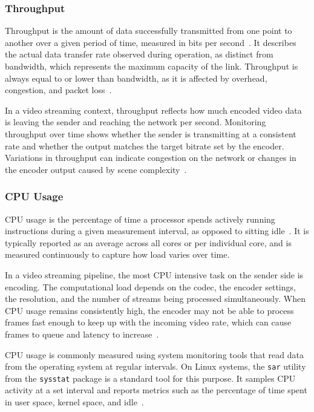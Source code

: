 \subsubsection{Throughput}\label{subsec:throughput}
Throughput is the amount of data successfully transmitted from one point to another over a given period of time, measured in bits per second~\cite{forouzan2012}. It describes the actual data transfer rate observed during operation, as distinct from bandwidth, which represents the maximum capacity of the link. Throughput is always equal to or lower than bandwidth, as it is affected by overhead, congestion, and packet loss~\cite{forouzan2012}.
 
In a video streaming context, throughput reflects how much encoded video data is leaving the sender and reaching the network per second. Monitoring throughput over time shows whether the sender is transmitting at a consistent rate and whether the output matches the target bitrate set by the encoder. Variations in throughput can indicate congestion on the network or changes in the encoder output caused by scene complexity~\cite{sodagar2011}.

\subsubsection{CPU Usage}\label{subsec:cpu}
CPU usage is the percentage of time a processor spends actively running instructions during a given measurement interval, as opposed to sitting idle~\cite{linode_sar}. It is typically reported as an average across all cores or per individual core, and is measured continuously to capture how load varies over time.
 
In a video streaming pipeline, the most CPU intensive task on the sender side is encoding. The computational load depends on the codec, the encoder settings, the resolution, and the number of streams being processed simultaneously. When CPU usage remains consistently high, the encoder may not be able to process frames fast enough to keep up with the incoming video rate, which can cause frames to queue and latency to increase~\cite{richardson2010}.
 
CPU usage is commonly measured using system monitoring tools that read data from the operating system at regular intervals. On Linux systems, the \texttt{sar} utility from the \texttt{sysstat} package is a standard tool for this purpose. It samples CPU activity at a set interval and reports metrics such as the percentage of time spent in user space, kernel space, and idle~\cite{linode_sar}.
 
